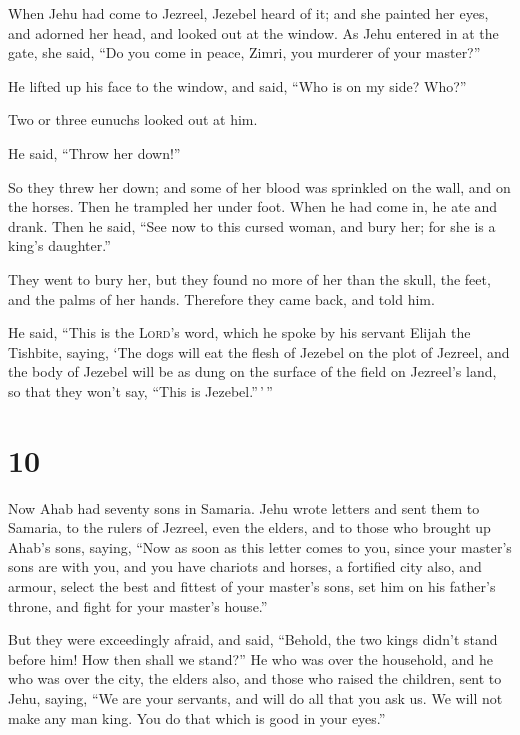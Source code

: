  When Jehu had come to Jezreel, Jezebel heard of it; and
she painted her eyes, and adorned her head, and looked out at the
window.  As Jehu entered in at the gate, she said, ``Do
you come in peace, Zimri, you murderer of your master?''

 He lifted up his face to the window, and said, ``Who is
on my side? Who?''

Two or three eunuchs looked out at him.

 He said, ``Throw her down!''

So they threw her down; and some of her blood was sprinkled on the wall,
and on the horses. Then he trampled her under foot.  When
he had come in, he ate and drank. Then he said, ``See now to this cursed
woman, and bury her; for she is a king's daughter.''

 They went to bury her, but they found no more of her
than the skull, the feet, and the palms of her hands. 
Therefore they came back, and told him.

He said, ``This is the \textsc{Lord}'s word, which he spoke by his
servant Elijah the Tishbite, saying, `The dogs will eat the flesh of
Jezebel on the plot of Jezreel,  and the body of Jezebel
will be as dung on the surface of the field on Jezreel's land, so that
they won't say, ``This is Jezebel.''\,'\,''

\hypertarget{section-9}{%
\section{10}\label{section-9}}

 Now Ahab had seventy sons in Samaria. Jehu wrote letters
and sent them to Samaria, to the rulers of Jezreel, even the elders, and
to those who brought up Ahab's sons, saying,  ``Now as
soon as this letter comes to you, since your master's sons are with you,
and you have chariots and horses, a fortified city also, and armour,
 select the best and fittest of your master's sons, set
him on his father's throne, and fight for your master's house.''

 But they were exceedingly afraid, and said, ``Behold, the
two kings didn't stand before him! How then shall we stand?''
 He who was over the household, and he who was over the
city, the elders also, and those who raised the children, sent to Jehu,
saying, ``We are your servants, and will do all that you ask us. We will
not make any man king. You do that which is good in your eyes.''

